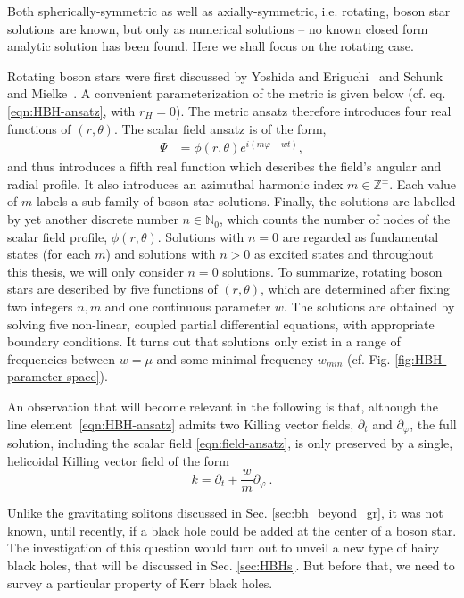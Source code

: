 Both spherically-symmetric as well as axially-symmetric, i.e. rotating, boson star solutions are known, but only as numerical solutions -- no known closed form analytic solution has been found.
Here we shall focus on the rotating case. 

Rotating boson stars were first discussed by Yoshida and Eriguchi~\cite{Yoshida:1997qf} and Schunk and Mielke~\cite{Schunck:1996he}.
A convenient parameterization of the metric is given below (cf. eq. \eqref{eqn:HBH-ansatz}, with $r_H=0$).
The metric ansatz therefore introduces four real functions of $(r,\theta)$.
The scalar field ansatz is of the form, 
\begin{align}
  \Psi &= \phi(r,\theta)e^{i(m\varphi-w t)},
  \label{eqn:field-ansatz}
\end{align}
and thus introduces a fifth real function which describes the field's angular and radial profile.
It also introduces an azimuthal harmonic index $m\in \mathbb{Z}^\pm$.
Each value of $m$ labels a sub-family of boson star solutions.
Finally, the solutions are labelled by yet another discrete number $n\in \mathbb{N}_0$, which counts the number of nodes of the scalar field profile, $\phi(r,\theta)$.
Solutions with $n=0$ are regarded as fundamental states (for each $m$) and solutions with $n>0$ as excited states and throughout this thesis, we will only consider $n=0$ solutions.
To summarize, rotating boson stars are described by five functions of $(r,\theta)$, which are determined after fixing two integers $n,m$ and one continuous parameter $w$.
The solutions are obtained by solving five non-linear, coupled partial differential equations, with appropriate boundary conditions.
It turns out that solutions only exist in a range of frequencies between $w=\mu$ and some minimal frequency $w_{min}$ (cf. Fig. \ref{fig:HBH-parameter-space}).

An observation that will become relevant in the following is that, although the line element~\eqref{eqn:HBH-ansatz} admits two Killing vector fields, $\partial_t$ and $\partial_\varphi$, the full solution, including the scalar field \eqref{eqn:field-ansatz}, is only preserved by a single, helicoidal Killing vector field of the form
\begin{equation}
k=\partial_t+\frac{w}{m}\partial_\varphi \ . 
\label{kvf}
\end{equation}

Unlike the gravitating solitons discussed in Sec. \ref{sec:bh_beyond_gr}, it was not known, until recently, if a black hole could be added at the center of a boson star.
The investigation of this question would turn out to unveil a new type of hairy black holes, that will be discussed in Sec. \ref{sec:HBHs}.
But before that, we need to survey a particular property of Kerr black holes. 

